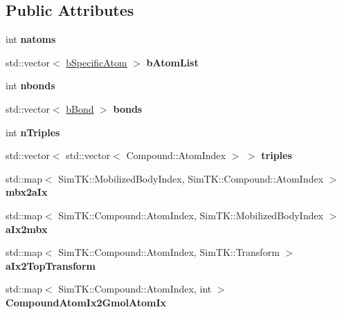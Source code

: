 \subsection*{Public Attributes}
\begin{DoxyCompactItemize}
\item 
int {\bfseries natoms}\hypertarget{classTopology_ab37d7bfd8071b37fadcab2240a09a70f}{}\label{classTopology_ab37d7bfd8071b37fadcab2240a09a70f}

\item 
std\+::vector$<$ \hyperlink{classbSpecificAtom}{b\+Specific\+Atom} $>$ {\bfseries b\+Atom\+List}\hypertarget{classTopology_a0dc44c74b9b1b34969a0dbdfcba01c5c}{}\label{classTopology_a0dc44c74b9b1b34969a0dbdfcba01c5c}

\item 
int {\bfseries nbonds}\hypertarget{classTopology_ac820bfb62c44bed210c25f3f5de1f249}{}\label{classTopology_ac820bfb62c44bed210c25f3f5de1f249}

\item 
std\+::vector$<$ \hyperlink{classbBond}{b\+Bond} $>$ {\bfseries bonds}\hypertarget{classTopology_a50b082ce708c2649e8565c78dcc5fb26}{}\label{classTopology_a50b082ce708c2649e8565c78dcc5fb26}

\item 
int {\bfseries n\+Triples}\hypertarget{classTopology_ac6249044e82bec9fe7fb4e3231be890c}{}\label{classTopology_ac6249044e82bec9fe7fb4e3231be890c}

\item 
std\+::vector$<$ std\+::vector$<$ Compound\+::\+Atom\+Index $>$ $>$ {\bfseries triples}\hypertarget{classTopology_a36327556d21652f41d8909d4600cbd22}{}\label{classTopology_a36327556d21652f41d8909d4600cbd22}

\item 
std\+::map$<$ Sim\+T\+K\+::\+Mobilized\+Body\+Index, Sim\+T\+K\+::\+Compound\+::\+Atom\+Index $>$ {\bfseries mbx2a\+Ix}\hypertarget{classTopology_aa8d85a909e7c1b6a4d5873c338fcf471}{}\label{classTopology_aa8d85a909e7c1b6a4d5873c338fcf471}

\item 
std\+::map$<$ Sim\+T\+K\+::\+Compound\+::\+Atom\+Index, Sim\+T\+K\+::\+Mobilized\+Body\+Index $>$ {\bfseries a\+Ix2mbx}\hypertarget{classTopology_a4a5d3182210d2dbd78e5653044ceafee}{}\label{classTopology_a4a5d3182210d2dbd78e5653044ceafee}

\item 
std\+::map$<$ Sim\+T\+K\+::\+Compound\+::\+Atom\+Index, Sim\+T\+K\+::\+Transform $>$ {\bfseries a\+Ix2\+Top\+Transform}\hypertarget{classTopology_a6049ad3ebf58010d60371b79d2b4bff7}{}\label{classTopology_a6049ad3ebf58010d60371b79d2b4bff7}

\item 
std\+::map$<$ Sim\+T\+K\+::\+Compound\+::\+Atom\+Index, int $>$ {\bfseries Compound\+Atom\+Ix2\+Gmol\+Atom\+Ix}\hypertarget{classTopology_adfc3264e9a0ec7b0f3b6c72202569d0e}{}\label{classTopology_adfc3264e9a0ec7b0f3b6c72202569d0e}

\end{DoxyCompactItemize}


